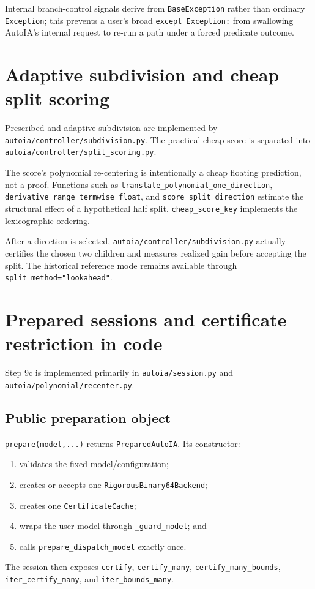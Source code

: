 \documentclass[11pt]{article}
\newcommand{\codepath}[1]{\nolinkurl{#1}}
\begin{document}
Internal branch-control signals derive from \texttt{BaseException} rather than
ordinary \texttt{Exception}; this prevents a user's broad
\texttt{except Exception:} from swallowing AutoIA's internal request to re-run a
path under a forced predicate outcome.

\section{Adaptive subdivision and cheap split scoring}

Prescribed and adaptive subdivision are implemented by
\codepath{autoia/controller/subdivision.py}.  The practical cheap score is
separated into \codepath{autoia/controller/split_scoring.py}.

The score's polynomial re-centering is intentionally a cheap floating prediction,
not a proof.  Functions such as \texttt{translate\_polynomial\_one\_direction},
\texttt{derivative\_range\_termwise\_float}, and
\texttt{score\_split\_direction} estimate the structural effect of a hypothetical
half split.  \texttt{cheap\_score\_key} implements the lexicographic ordering.

After a direction is selected, \codepath{autoia/controller/subdivision.py}
actually certifies the chosen two children and measures realized gain before
accepting the split.  The historical reference mode remains available through
\texttt{split\_method="lookahead"}.

\section{Prepared sessions and certificate restriction in code}

Step 9c is implemented primarily in \codepath{autoia/session.py} and
\codepath{autoia/polynomial/recenter.py}.

\subsection{Public preparation object}

\texttt{prepare(model,...)} returns \texttt{PreparedAutoIA}.  Its constructor:
\begin{enumerate}[leftmargin=*]
\item validates the fixed model/configuration;
\item creates or accepts one \texttt{RigorousBinary64Backend};
\item creates one \texttt{CertificateCache};
\item wraps the user model through \texttt{\_guard\_model}; and
\item calls \texttt{prepare\_dispatch\_model} exactly once.
\end{enumerate}
The session then exposes \texttt{certify}, \texttt{certify\_many},
\texttt{certify\_many\_bounds}, \texttt{iter\_certify\_many}, and
\texttt{iter\_bounds\_many}.
\end{document}
